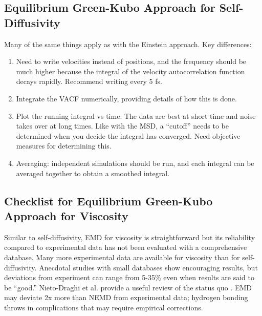 \documentclass[9pt]{livecoms}
\begin{document}
\subsection{Equilibrium Green-Kubo Approach for Self-Diffusivity}

Many of the same things apply as with the Einstein approach. Key differences:

\begin{enumerate}
	\item Need to write velocities instead of positions, and the frequency should be much higher because the integral of the velocity autocorrelation function decays rapidly. Recommend writing every 5 fs. 
	\item Integrate the VACF numerically, providing details of how this is done.
	\item Plot the running integral vs time. The data are best at short time and noise takes over at long times. Like with the MSD, a “cutoff” needs to be determined when you decide the integral has converged. Need objective measures for determining this.
	\item Averaging: independent simulations should be run, and each integral can be averaged together to obtain a smoothed integral. 
\end{enumerate}

\subsection{Checklist for Equilibrium Green-Kubo Approach for Viscosity}

Similar to self-diffusivity, EMD for viscosity is straightforward but its reliability compared to experimental data has not been evaluated with a comprehensive database. Many more experimental data are available for viscosity than for self-diffusivity. Anecdotal studies with small databases show encouraging results, but deviations from experiment can range from 5-35\% even when results are said to be “good.” Nieto-Draghi et al. provide a useful review of the status quo \cite{Nieto2015}. EMD may deviate 2x more than NEMD from experimental data; hydrogen bonding throws in complications that may require empirical corrections. 

\end{document}
